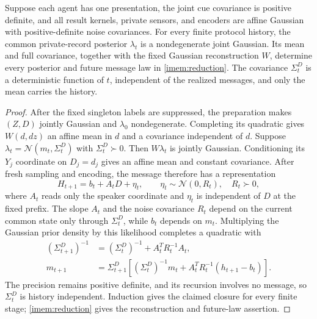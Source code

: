 Suppose each agent has one presentation, the joint cue covariance is positive definite, and all result kernels, private sensors, and encoders are affine Gaussian with positive-definite noise covariances. For every finite protocol history, the common private-record posterior $\lambda_t$ is a nondegenerate joint Gaussian. Its mean and full covariance, together with the fixed Gaussian reconstruction $W$, determine every posterior and future message law in \cref{imem:reduction}. The covariance $\Sigma^D_t$ is a deterministic function of $t$, independent of the realized messages, and only the mean carries the history.
\begin{proof}
After the fixed singleton labels are suppressed, the preparation makes $(Z,D)$ jointly Gaussian and $\lambda_0$ nondegenerate. Completing its quadratic gives $W(d,dz)$ an affine mean in $d$ and a covariance independent of $d$. Suppose $\lambda_t=\mathcal N(m_t,\Sigma^D_t)$ with $\Sigma^D_t\succ0$. Then $W\lambda_t$ is jointly Gaussian. Conditioning its $Y_j$ coordinate on $D_j=d_j$ gives an affine mean and constant covariance. After fresh sampling and encoding, the message therefore has a representation
\begin{equation}
 H_{t+1}=b_t+A_tD+\eta_t,\qquad
 \eta_t\sim\mathcal N(0,R_t),\quad R_t\succ0,
 \label{imem:gaussian-reduced-observation}
\end{equation}
where $A_t$ reads only the speaker coordinate and $\eta_t$ is independent of $D$ at the fixed prefix. The slope $A_t$ and the noise covariance $R_t$ depend on the current common state only through $\Sigma^D_t$, while $b_t$ depends on $m_t$. Multiplying the Gaussian prior density by this likelihood completes a quadratic with
\begin{equation}
 \begin{aligned}
 (\Sigma^D_{t+1})^{-1}&=(\Sigma^D_t)^{-1}+A_t^TR_t^{-1}A_t,\\
 m_{t+1}&=\Sigma^D_{t+1}\left[(\Sigma^D_t)^{-1}m_t+A_t^TR_t^{-1}(h_{t+1}-b_t)\right].
 \end{aligned}
 \label{imem:gaussian-reduced-recursion}
\end{equation}
The precision remains positive definite, and its recursion involves no message, so $\Sigma^D_t$ is history independent. Induction gives the claimed closure for every finite stage; \cref{imem:reduction} gives the reconstruction and future-law assertion.
\end{proof}

